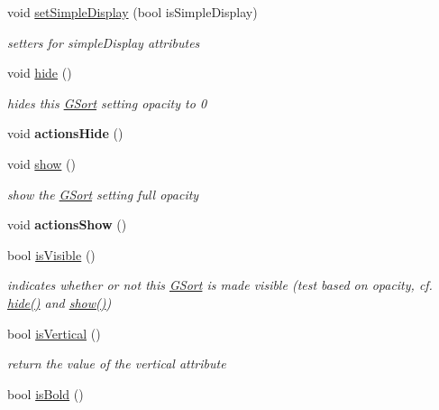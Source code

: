 \begin{DoxyCompactItemize}
\item 
void \hyperlink{classGSort_a8fb117049ba9dd1c0a98bdfe44d2b647}{set\+Simple\+Display} (bool is\+Simple\+Display)
\begin{DoxyCompactList}\small\item\em setters for simple\+Display attributes \end{DoxyCompactList}\item 
\hypertarget{classGSort_acafeaec8637b62aea47c2ecb4c36e0be}{void \hyperlink{classGSort_acafeaec8637b62aea47c2ecb4c36e0be}{hide} ()}\label{classGSort_acafeaec8637b62aea47c2ecb4c36e0be}

\begin{DoxyCompactList}\small\item\em hides this \hyperlink{classGSort}{G\+Sort} setting opacity to 0 \end{DoxyCompactList}\item 
\hypertarget{classGSort_a0d487a46aa66f74d68b68e54158b4979}{void {\bfseries actions\+Hide} ()}\label{classGSort_a0d487a46aa66f74d68b68e54158b4979}

\item 
\hypertarget{classGSort_a6cb13a9b6ef35dc7698b165ff0d34b88}{void \hyperlink{classGSort_a6cb13a9b6ef35dc7698b165ff0d34b88}{show} ()}\label{classGSort_a6cb13a9b6ef35dc7698b165ff0d34b88}

\begin{DoxyCompactList}\small\item\em show the \hyperlink{classGSort}{G\+Sort} setting full opacity \end{DoxyCompactList}\item 
\hypertarget{classGSort_a4034d89e182ef3b925943a7502f86bea}{void {\bfseries actions\+Show} ()}\label{classGSort_a4034d89e182ef3b925943a7502f86bea}

\item 
\hypertarget{classGSort_a58e2a6099a59b26ffe7dafd90590bd3d}{bool \hyperlink{classGSort_a58e2a6099a59b26ffe7dafd90590bd3d}{is\+Visible} ()}\label{classGSort_a58e2a6099a59b26ffe7dafd90590bd3d}

\begin{DoxyCompactList}\small\item\em indicates whether or not this \hyperlink{classGSort}{G\+Sort} is made visible (test based on opacity, cf. \hyperlink{classGSort_acafeaec8637b62aea47c2ecb4c36e0be}{hide()} and \hyperlink{classGSort_a6cb13a9b6ef35dc7698b165ff0d34b88}{show()}) \end{DoxyCompactList}\item 
bool \hyperlink{classGSort_adc28cc76ca52518252608fb37ff485ea}{is\+Vertical} ()
\begin{DoxyCompactList}\small\item\em return the value of the vertical attribute \end{DoxyCompactList}\item 
\hypertarget{classGSort_ab9f808442b0bc03573566deaec8fa3f8}{bool \hyperlink{classGSort_ab9f808442b0bc03573566deaec8fa3f8}{is\+Bold} ()}\label{classGSort_ab9f808442b0bc03573566deaec8fa3f8}


\end{DoxyCompactItemize}
